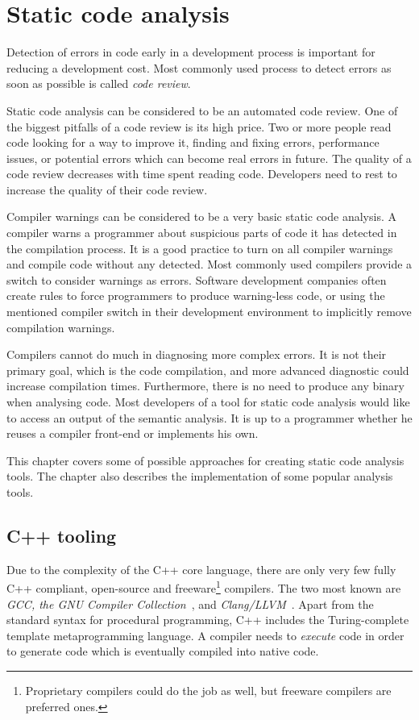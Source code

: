 \chapter{Static code analysis}
Detection of errors in code early in a development process is important for reducing a development cost. Most commonly used process to detect errors as soon as possible is called \emph{code review}.

Static code analysis can be considered to be an automated code review. One of the biggest pitfalls of a code review is its high price. Two or more people read code looking for a way to improve it, finding and fixing errors, performance issues, or potential errors which can become real errors in future. The quality of a code review decreases with time spent reading code. Developers need to rest to increase the quality of their code review.

Compiler warnings can be considered to be a very basic static code analysis. A compiler warns a programmer about suspicious parts of code it has detected in the compilation process. It is a good practice to turn on all compiler warnings and compile code without any detected. Most commonly used compilers provide a switch to consider warnings as errors. Software development companies often create rules to force programmers to produce warning-less code, or using the mentioned compiler switch in their development environment to implicitly remove compilation warnings.

Compilers cannot do much in diagnosing more complex errors. It is not their primary goal, which is the code compilation, and more advanced diagnostic could increase compilation times. Furthermore, there is no need to produce any binary when analysing code. Most developers of a tool for static code analysis would like to access an output of the semantic analysis. It is up to a programmer whether he reuses a compiler front-end or implements his own.

This chapter covers some of possible approaches for creating static code analysis tools. The chapter also describes the implementation of some popular analysis tools.

\section{C++ tooling}
Due to the complexity of the C++ core language, there are only very few fully C++ compliant, open-source and freeware\footnote{Proprietary compilers could do the job as well, but freeware compilers are preferred ones.} compilers. The two most known are \emph{GCC, the GNU Compiler Collection}~\cite{gcc}, and \emph{Clang/LLVM}~\cite{clang}. Apart from the standard syntax for procedural programming, C++ includes the Turing-complete template metaprogramming language. A compiler needs to \textit{execute} code in order to generate code which is eventually compiled into native code.

